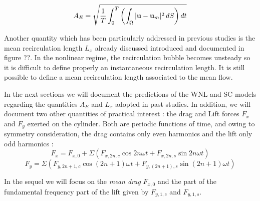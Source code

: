 \documentclass[twocolumn,10pt]{asme2ej}
\newcommand{\be}[1]{ \begin{equation} \label{#1}}
\newcommand{\ee}{\end{equation}}
\begin{document}
\be{defAnergy}
A_E = \sqrt{\frac{1}{T} \int_0^{T} \left( \int_\Omega | {\bf u} - {\bf u}_m |^2 \, dS \right) dt}
\ee


Another quantity which has been particularly addressed in previous studies is the mean recirculation length $L_x$
already discussed introduced and documented in figure ??. In the nonlinear regime, the recirculation bubble becomes unsteady so it is difficult to define properly an instantaneous recirculation length. It is still possible to define a mean recirculation length associated to the mean flow.

In the next sections we will document the predictions of the WNL and SC models regarding the quantities $A_E$ and $L_x$ adopted in past studies. In addition, we will document two other quantities of practical interest : the drag and Lift forces $F_x$ and $F_y$ exerted on the cylinder. 
Both are periodic functions of time, and owing to symmetry consideration, the drag contains only even harmonics and the lift only odd harmonics :
$$
F_x  = F_{x,0}  + \Sigma \left(  F_{x,2n,c} \cos 2 n \omega t + F_{x,2n,s} \sin 2 n  \omega t \right)
$$
$$
F_y  =  \Sigma \left(  F_{y,{2n+1},c} \cos (2n+1) \omega t + F_{y,(2n+1),s} \sin (2n+1) \omega t \right)
$$

In the sequel we will focus on the {\em mean drag}
 $F_{x,0}$ and the part of the fundamental frequency part of the lift  given by $F_{y,1,c}$ and $F_{y,1,s}$.
 
 
   




\end{document}
